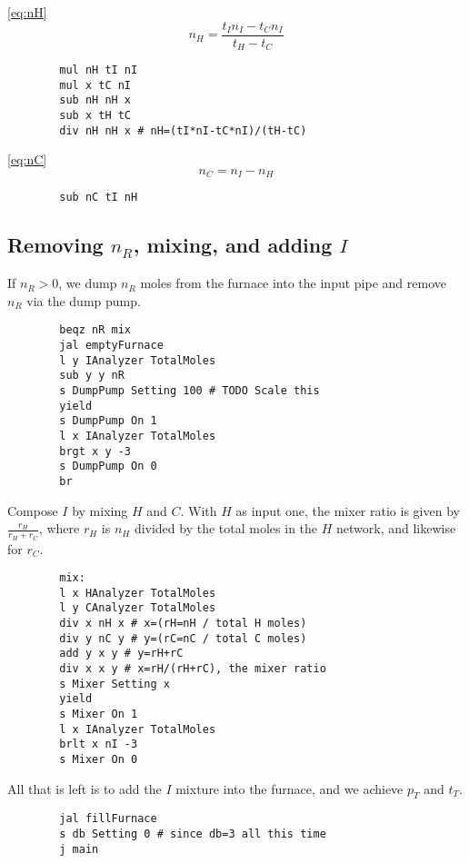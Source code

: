 \documentclass{article}
\begin{document}
\begin{paracol}{2}
    \switchcolumn*
    \noindent
    \autoref{eq:nH}
    \[
        n_H = \frac{t_I n_I-t_C n_I}{t_H-t_C}
    \]
    \switchcolumn
    \vspace{-1em}
    \begin{verbatim}
        mul nH tI nI
        mul x tC nI
        sub nH nH x
        sub x tH tC
        div nH nH x # nH=(tI*nI-tC*nI)/(tH-tC)
    \end{verbatim}
    \switchcolumn*
    \noindent
    \autoref{eq:nC}
    \[
        n_C = n_I-n_H
    \]
    \switchcolumn
    \vspace{-1em}
    \begin{verbatim}
        sub nC tI nH
    \end{verbatim}
\end{paracol}

\subsection{Removing $n_R$, mixing, and adding $I$}

\vspace{1em}
\begin{paracol}{2}
    If $n_R>0$, we dump $n_R$ moles from the furnace into the input pipe
    and remove $n_R$ via the dump pump.
    \switchcolumn
    \begin{verbatim}
        beqz nR mix
        jal emptyFurnace
        l y IAnalyzer TotalMoles
        sub y y nR
        s DumpPump Setting 100 # TODO Scale this
        yield
        s DumpPump On 1
        l x IAnalyzer TotalMoles
        brgt x y -3
        s DumpPump On 0
        br
    \end{verbatim}
    \switchcolumn*
    \noindent
    Compose $I$ by mixing $H$ and $C$.
    With $H$ as input one, the mixer ratio is given by
    $\frac{r_H}{r_H+r_C}$, where
    $r_H$ is $n_H$ divided by the total moles in the $H$ network,
    and likewise for $r_C$.
    \switchcolumn
    \vspace{-1em}
    \begin{verbatim}
        mix:
        l x HAnalyzer TotalMoles
        l y CAnalyzer TotalMoles
        div x nH x # x=(rH=nH / total H moles)
        div y nC y # y=(rC=nC / total C moles)
        add y x y # y=rH+rC
        div x x y # x=rH/(rH+rC), the mixer ratio
        s Mixer Setting x
        yield
        s Mixer On 1
        l x IAnalyzer TotalMoles
        brlt x nI -3
        s Mixer On 0
    \end{verbatim}
    \switchcolumn*
    \noindent
    All that is left is to add the $I$ mixture into the furnace,
    and we achieve $p_T$ and $t_T$.
    \switchcolumn
    \vspace{-1em}
    \begin{verbatim}
        jal fillFurnace
        s db Setting 0 # since db=3 all this time
        j main
    \end{verbatim}
\end{paracol}
\end{document}

